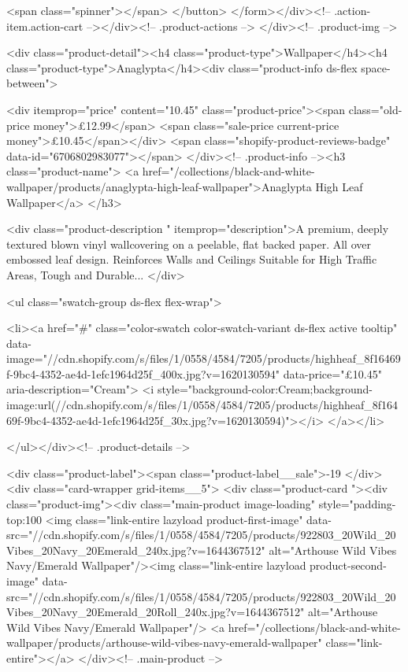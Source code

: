 {{{{{{{              <span class="spinner"></span>
            </button>
          </form></div><!-- .action-item.action-cart --></div><!-- .product-actions -->
</div><!-- .product-img -->

<div class="product-detail"><h4 class="product-type">Wallpaper</h4><h4 class="product-type">Anaglypta</h4><div class="product-info ds-flex space-between">
    
<div itemprop="price" content="10.45" class="product-price"><span class="old-price money">£12.99</span>
    <span class="sale-price current-price money">£10.45</span></div>
    <span class="shopify-product-reviews-badge" data-id="6706802983077"></span>
  </div><!-- .product-info --><h3 class="product-name">
      <a href="/collections/black-and-white-wallpaper/products/anaglypta-high-leaf-wallpaper">Anaglypta High Leaf Wallpaper</a>
    </h3>
    
<div class="product-description " itemprop="description">A premium, deeply textured blown vinyl wallcovering on a peelable, flat backed paper. All over embossed leaf design. Reinforces Walls and Ceilings Suitable for High Traffic Areas, Tough and Durable...
</div>



<ul class="swatch-group ds-flex flex-wrap">
        
<li><a href="#" class="color-swatch color-swatch-variant ds-flex active tooltip" data-image="//cdn.shopify.com/s/files/1/0558/4584/7205/products/highheaf_8f16469f-9bc4-4352-ae4d-1efc1964d25f_400x.jpg?v=1620130594" data-price="£10.45" aria-description="Cream">
              <i style="background-color:Cream;background-image:url(//cdn.shopify.com/s/files/1/0558/4584/7205/products/highheaf_8f16469f-9bc4-4352-ae4d-1efc1964d25f_30x.jpg?v=1620130594)"></i>
            </a></li>

      </ul></div><!-- .product-details -->

<div class="product-label"><span class="product-label__sale">-19%
          </div><div class="card-wrapper grid-items__5">
            <div class="product-card "><div class="product-img"><div class="main-product image-loading" style="padding-top:100%
      <img class="link-entire lazyload product-first-image" data-src="//cdn.shopify.com/s/files/1/0558/4584/7205/products/922803_20Wild_20Vibes_20Navy_20Emerald_240x.jpg?v=1644367512" alt="Arthouse Wild Vibes Navy/Emerald Wallpaper"/><img class="link-entire lazyload product-second-image" data-src="//cdn.shopify.com/s/files/1/0558/4584/7205/products/922803_20Wild_20Vibes_20Navy_20Emerald_20Roll_240x.jpg?v=1644367512" alt="Arthouse Wild Vibes Navy/Emerald Wallpaper"/>
      <a href="/collections/black-and-white-wallpaper/products/arthouse-wild-vibes-navy-emerald-wallpaper" class="link-entire"></a>
    </div><!-- .main-product -->
  
}}}}}}}
